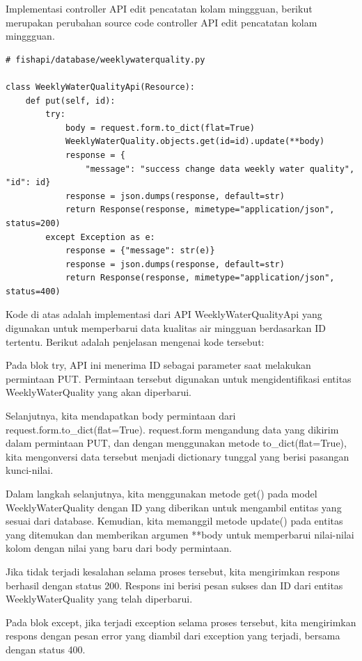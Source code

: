 \begin{enumerate}[1.]
Implementasi controller API edit pencatatan kolam minggguan, berikut merupakan perubahan source code controller API edit pencatatan kolam minggguan.

\begin{lstlisting}
# fishapi/database/weeklywaterquality.py

class WeeklyWaterQualityApi(Resource):
    def put(self, id):
        try:
            body = request.form.to_dict(flat=True)
            WeeklyWaterQuality.objects.get(id=id).update(**body)
            response = {
                "message": "success change data weekly water quality", "id": id}
            response = json.dumps(response, default=str)
            return Response(response, mimetype="application/json", status=200)
        except Exception as e:
            response = {"message": str(e)}
            response = json.dumps(response, default=str)
            return Response(response, mimetype="application/json", status=400)
\end{lstlisting}



Kode di atas adalah implementasi dari API WeeklyWaterQualityApi yang digunakan untuk memperbarui data kualitas air mingguan berdasarkan ID tertentu. Berikut adalah penjelasan mengenai kode tersebut:

Pada blok try, API ini menerima ID sebagai parameter saat melakukan permintaan PUT. Permintaan tersebut digunakan untuk mengidentifikasi entitas WeeklyWaterQuality yang akan diperbarui.

Selanjutnya, kita mendapatkan body permintaan dari request.form.to\_dict(flat=True). request.form mengandung data yang dikirim dalam permintaan PUT, dan dengan menggunakan metode to\_dict(flat=True), kita mengonversi data tersebut menjadi dictionary tunggal yang berisi pasangan kunci-nilai.

Dalam langkah selanjutnya, kita menggunakan metode get() pada model WeeklyWaterQuality dengan ID yang diberikan untuk mengambil entitas yang sesuai dari database. Kemudian, kita memanggil metode update() pada entitas yang ditemukan dan memberikan argumen **body untuk memperbarui nilai-nilai kolom dengan nilai yang baru dari body permintaan.

Jika tidak terjadi kesalahan selama proses tersebut, kita mengirimkan respons berhasil dengan status 200. Respons ini berisi pesan sukses dan ID dari entitas WeeklyWaterQuality yang telah diperbarui.

Pada blok except, jika terjadi exception selama proses tersebut, kita mengirimkan respons dengan pesan error yang diambil dari exception yang terjadi, bersama dengan status 400.


\end{enumerate}
